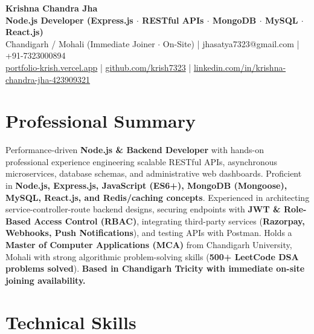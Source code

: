 \documentclass[a4paper,10pt]{article}
\begin{document}
\begin{center}

    {\LARGE \textbf{Krishna Chandra Jha}} \\[2.5pt]

    \textbf{Node.js Developer (Express.js $\cdot$ RESTful APIs $\cdot$ MongoDB $\cdot$ MySQL $\cdot$ React.js)} \\[3.5pt]

    Chandigarh / Mohali (Immediate Joiner $\cdot$ On-Site)
    \quad | \quad
    jhasatya7323@gmail.com
    \quad | \quad
    +91-7323000894
    \\[2.5pt]

    \href{https://portfolio-ashen-alpha-dv0whhsamo.vercel.app/}{portfolio-krish.vercel.app}
    \quad | \quad
    \href{https://github.com/krish7323}{github.com/krish7323}
    \quad | \quad
    \href{https://linkedin.com/in/krishna-chandra-jha-423909321}
    {linkedin.com/in/krishna-chandra-jha-423909321}

\end{center}

\section*{Professional Summary}

Performance-driven \textbf{Node.js \& Backend Developer} with hands-on professional experience engineering scalable RESTful APIs, asynchronous microservices, database schemas, and administrative web dashboards. Proficient in \textbf{Node.js, Express.js, JavaScript (ES6+), MongoDB (Mongoose), MySQL, React.js, and Redis/caching concepts}. Experienced in architecting service-controller-route backend designs, securing endpoints with \textbf{JWT \& Role-Based Access Control (RBAC)}, integrating third-party services (\textbf{Razorpay, Webhooks, Push Notifications}), and testing APIs with Postman. Holds a \textbf{Master of Computer Applications (MCA)} from Chandigarh University, Mohali with strong algorithmic problem-solving skills (\textbf{500+ LeetCode DSA problems solved}). \textbf{Based in Chandigarh Tricity with immediate on-site joining availability.}

\section*{Technical Skills}
\end{document}
